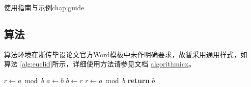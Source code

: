 \begin{cuzchapter}{使用指南与示例}{chap:guide}

    \subsection{算法}\label{sub:algorithms}

    算法环境在浙传毕设论文官方Word模板中未作明确要求，故暂采用通用样式，如算法
    \ref{alg:euclid}所示，详细使用方法请参见文档
    \href{https://ctan.org/pkg/algorithmicx?lang=en}{algorithmicx}。

    \begin{algorithm}[h]
        \small
        \caption{Euclid算法}\label{alg:euclid}
        \begin{algorithmic}[1]
            \State $r\gets a\bmod b$
            \State $a\gets b$
            \State $b\gets r$
            \State $r\gets a\bmod b$
            \EndWhile\label{euclidendwhile}
            \State \textbf{return} $b$
            \EndProcedure
        \end{algorithmic}
    \end{algorithm}


\end{cuzchapter}
